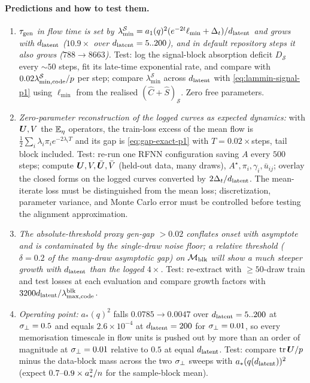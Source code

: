 \paragraph{Predictions and how to test them.}
\begin{enumerate}
\item \emph{$\tau_{\mathrm{gen}}$ in flow time is set by $\lambda^{\mathcal S}_{\min}=a_1(q)^2(e^{-2t}\ell_{\min}+\Delta_t)/d_{\mathrm{latent}}$ and grows with $d_{\mathrm{latent}}$ ($10.9\times$ over $d_{\mathrm{latent}}=5..200$), and in default repository steps it also grows ($788\to8663$).} Test: log the signal-block absorption deficit $D_{\mathcal S}$ every $\sim50$ steps, fit its late-time exponential rate, and compare with $0.02\lambda^{\mathcal S}_{\min,\rm code}/p$ per step; compare $\lambda^{\mathcal S}_{\min}$ across $d_{\mathrm{latent}}$ with \eqref{eq:lammin-signal-p1} using $\ell_{\min}$ from the realised $(\hat C+\hat S)_{\mathcal S}$. Zero free parameters.
\item \emph{Zero-parameter reconstruction of the logged curves as expected dynamics:} with $\bm{U},V$ the $\mathbb{E}_\eta$ operators, the train-loss excess of the mean flow is $\tfrac12\sum_i\lambda_i\pi_ie^{-2\lambda_iT}$ and its gap is \eqref{eq:gap-exact-p1} with $T=0.02\times$steps, tail block included. Test: re-run one RFNN configuration saving $A$ every $500$ steps; compute $\bm{U},V,\bar{\bm{U}},\bar V$ (held-out data, many draws), $A^\star,\pi_i,\gamma_i,\bar u_{ij}$; overlay the closed forms on the logged curves converted by $2\Delta_t/d_{\mathrm{latent}}$. The mean-iterate loss must be distinguished from the mean loss; discretization, parameter variance, and Monte Carlo error must be controlled before testing the alignment approximation.
\item \emph{The absolute-threshold proxy gen-gap $>0.02$ conflates onset with asymptote and is contaminated by the single-draw noise floor; a relative threshold ($\delta=0.2$ of the many-draw asymptotic gap) on $\mathcal M_{\rm blk}$ will show a much steeper growth with $d_{\mathrm{latent}}$ than the logged $4\times$.} Test: re-extract with $\ge50$-draw train and test losses at each evaluation and compare growth factors with $3200d_{\mathrm{latent}}/\lambda^{\rm blk}_{\max,\rm code}$.
\item \emph{Operating point:} $a_*(q)^2$ falls $0.0785\to0.0047$ over $d_{\mathrm{latent}}=5..200$ at $\sigma_{\perp}=0.5$ and equals $2.6\times10^{-4}$ at $d_{\mathrm{latent}}=200$ for $\sigma_{\perp}=0.01$, so every memorisation timescale in flow units is pushed out by more than an order of magnitude at $\sigma_{\perp}=0.01$ relative to $0.5$ at equal $d_{\mathrm{latent}}$. Test: compare $\operatorname{tr}\bm{U}/p$ minus the data-block mass across the two $\sigma_{\perp}$ sweeps with $a_*(q(d_{\mathrm{latent}}))^2$ (expect $0.7$--$0.9\times a_*^2/n$ for the sample-block mean).

\end{enumerate}
